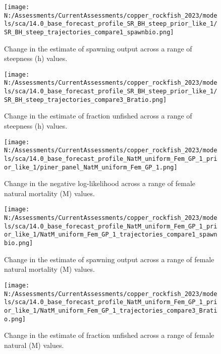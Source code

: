 \documentclass[11pt,
  english,
  letterpaper,
]{article}
\begin{document}
\pagebreak

\begin{figure}
\centering
\texttt{[image: N:/Assessments/CurrentAssessments/copper\_rockfish\_2023/models/sca/14.0\_base\_forecast\_profile\_SR\_BH\_steep\_prior\_like\_1/SR\_BH\_steep\_trajectories\_compare1\_spawnbio.png]}
\caption{Change in the estimate of spawning output across a range of steepness (h) values.\label{fig:h-ssb}}
\end{figure}

\pagebreak

\begin{figure}
\centering
\texttt{[image: N:/Assessments/CurrentAssessments/copper\_rockfish\_2023/models/sca/14.0\_base\_forecast\_profile\_SR\_BH\_steep\_prior\_like\_1/SR\_BH\_steep\_trajectories\_compare3\_Bratio.png]}
\caption{Change in the estimate of fraction unfished across a range of steepness (h) values.\label{fig:h-depl}}
\end{figure}

\pagebreak

\begin{figure}
\centering
\texttt{[image: N:/Assessments/CurrentAssessments/copper\_rockfish\_2023/models/sca/14.0\_base\_forecast\_profile\_NatM\_uniform\_Fem\_GP\_1\_prior\_like\_1/piner\_panel\_NatM\_uniform\_Fem\_GP\_1.png]}
\caption{Change in the negative log-likelihood across a range of female natural mortality (M) values.\label{fig:m-profile}}
\end{figure}

\pagebreak

\begin{figure}
\centering
\texttt{[image: N:/Assessments/CurrentAssessments/copper\_rockfish\_2023/models/sca/14.0\_base\_forecast\_profile\_NatM\_uniform\_Fem\_GP\_1\_prior\_like\_1/NatM\_uniform\_Fem\_GP\_1\_trajectories\_compare1\_spawnbio.png]}
\caption{Change in the estimate of spawning output across a range of female natural mortality (M) values.\label{fig:m-ssb}}
\end{figure}

\pagebreak

\begin{figure}
\centering
\texttt{[image: N:/Assessments/CurrentAssessments/copper\_rockfish\_2023/models/sca/14.0\_base\_forecast\_profile\_NatM\_uniform\_Fem\_GP\_1\_prior\_like\_1/NatM\_uniform\_Fem\_GP\_1\_trajectories\_compare3\_Bratio.png]}
\caption{Change in the estimate of fraction unfished across a range of female natural (M) values.\label{fig:m-depl}}
\end{figure}
\end{document}
